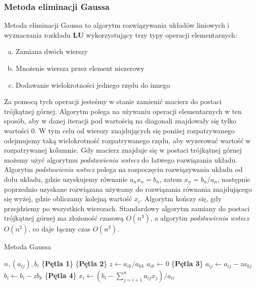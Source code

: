 \documentclass[12pt]{article}
\begin{document}
\subsubsection*{Metoda eliminacji Gaussa}
Metoda eliminacji Gaussa to algorytm rozwiązywania układów liniowych i wyznaczania rozkładu \textbf{LU} wykorzystujący trzy typy operacji elementarnych:
\begin{enumerate}[(a)]
	\item Zamiana dwóch wierszy
	\item Mnożenie wiersza przez element niezerowy
	\item Dodawanie wielokrotności jednego rzędu do innego
\end{enumerate}
Za pomocą tych operacji jesteśmy w stanie zamienić macierz do postaci trójkątnej górnej. Algorytm polega na używaniu operacji elementarnych w ten sposób, aby w danej iteracji pod wartością na diagonali znajdowały się tylko wartości 0. W tym celu od wierszy znajdujących się poniżej rozpatrywanego odejmujemy taką wielokrotność rozpatrywanego rzędu, aby wyzerować wartość w rozpatrywanej kolumnie. Gdy macierz znajduje się w postaci trójkątnej górnej możemy użyć algorytmu \textit{podstawienia wstecz} do łatwego rozwiązania układu. Algorytm \textit{podstawienia wstecz} polega na rozpoczęciu rozwiązywania układu od dołu układu, gdzie uzyskujemy równanie $a_n x_n = b_n$, zatem $x_n = b_n/a_n$, następnie poprzednio uzyskane rozwiązana używamy do rozwiązania równania znajdującego się wyżej, gdzie obliczamy kolejną wartość $x_i$. Algorytm kończy się, gdy przejdziemy po wszystkich wierszach.
Standardowy algorytm zamiany do postaci trójkątnej górnej ma złożoność czasową $O(n^3)$, a algorytm \textit{podstawienia wstecz} $O(n^2)$, co daje łączny czas $O(n^3)$.

\begin{algorithm} %
\caption{Metoda Gaussa}
\label{alg1} %
\begin{algorithmic} %
    \REQUIRE $n, (a_{ij}), b_i$
    \STATE \{\textbf{Pętla 1}\}
    		\STATE \{\textbf{Pętla 2}\}
		\STATE $z \leftarrow a_{ik}/a_{kk}$
		\STATE $a_{ik} \leftarrow 0$
    			\STATE \{\textbf{Pętla 3}\}
				\STATE $a_{ij} \leftarrow a_{ij} - z a_{kj}$
    			\ENDFOR
    			\STATE $b_i \leftarrow b_i - z b_k$
    		\ENDFOR
    \ENDFOR
    \STATE \{\textbf{Pętla 4}\}
		\STATE $x_i \leftarrow (b_i - \sum^n_{j=i+1}a_{ij}x_j)/a_{ii}$
    \ENDFOR
\end{algorithmic}
\end{algorithm}
\end{document}
